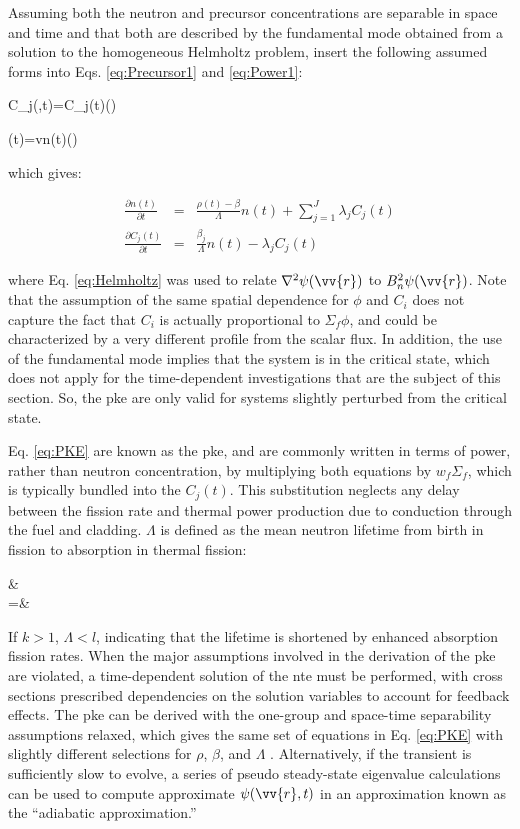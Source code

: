 Assuming both the neutron and precursor concentrations are separable in space and time and that both are described by the fundamental mode obtained from a solution to the homogeneous Helmholtz problem, insert the following assumed forms into Eqs. \eqref{eq:Precursor1} and \eqref{eq:Power1}:

\beq
C_j(,t)=C_j(t)\psi()
\eeq

\beq
\phi(t)=vn(t)\psi()
\eeq

which gives:

\begin{subequations}
\label{eq:PKE}
\begin{eqnarray}
\frac{\partial n(t)}{\partial t}&=&\frac{\rho(t)-\beta}{\Lambda}n(t)+\sum_{j=1}^J\lambda_jC_j(t)\\
\frac{\partial C_j(t)}{\partial t}&=&\frac{\beta_j}{\Lambda}n(t)-\lambda_jC_j(t)
\end{eqnarray}
\end{subequations}

where Eq. \eqref{eq:Helmholtz} was used to relate \(\nabla^2\psi(\vv{r})\) to \(B_n^2\psi(\vv{r})\). Note that the assumption of the same spatial dependence for \(\phi\) and \(C_i\) does not capture the fact that \(C_i\) is actually proportional to \(\Sigma_f\phi\), and could be characterized by a very different profile from the scalar flux. In addition, the use of the fundamental mode implies that the system is in the critical state, which does not apply for the time-dependent investigations that are the subject of this section. So, the \gls{pke} are only valid for systems slightly perturbed from the critical state.

Eq. \eqref{eq:PKE} are known as the \gls{pke}, and are commonly written in terms of power, rather than neutron concentration, by multiplying both equations by \(w_f\Sigma_f\), which is typically bundled into the \(C_j(t)\). This substitution neglects any delay between the fission rate and thermal power production due to conduction through the fuel and cladding. \(\Lambda\) is defined as the mean neutron lifetime from birth in fission to absorption in thermal fission:

\beqa
\label{eq:LambdaDef}
\Lambda\equiv&\\
=&
\eeqa

If \(k>1\), \(\Lambda<l\), indicating that the lifetime is shortened by enhanced absorption fission rates. When the major assumptions involved in the derivation of the \gls{pke} are violated, a time-dependent solution of the \gls{nte} must be performed, with cross sections prescribed dependencies on the solution variables to account for feedback effects. The \gls{pke} can be derived with the one-group and space-time separability assumptions relaxed, which gives the same set of equations in Eq. \eqref{eq:PKE} with slightly different selections for \(\rho\), \(\beta\), and \(\Lambda\) \cite{duderstadt}. Alternatively, if the transient is sufficiently slow to evolve, a series of pseudo steady-state eigenvalue calculations can be used to compute approximate \(\psi(\vv{r},t)\) in an approximation known as the ``adiabatic approximation.''

